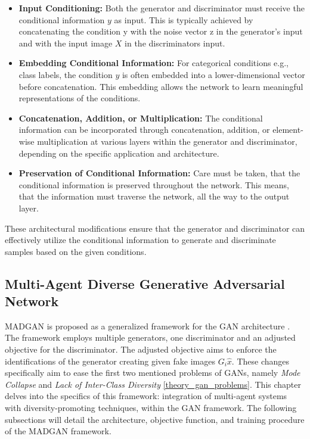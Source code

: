 \begin{itemize}
    \item \textbf{Input Conditioning:} Both the generator and discriminator must receive the conditional information \(y\) as input. This is typically achieved by concatenating the condition y with the noise vector z in the generator's input and with the input image \(X\) in the discriminators input.
    \item \textbf{Embedding Conditional Information:} For categorical conditions e.g., class labels, the condition \(y\) is often embedded into a lower-dimensional vector before concatenation. This embedding allows the network to learn meaningful representations of the conditions.
    \item \textbf{Concatenation, Addition, or Multiplication:} The conditional information can be incorporated through concatenation, addition, or element-wise multiplication at various layers within the generator and discriminator, depending on the specific application and architecture.
    \item \textbf{Preservation of Conditional Information:} Care must be taken, that the conditional information is preserved throughout the network. This means, that the information must traverse the network, all the way to the output layer.
\end{itemize}

\noindent
These architectural modifications ensure that the generator and discriminator can effectively utilize the conditional information to generate and discriminate samples based on the given conditions.

\subsection[Multi-Agent Diverse Generative Adversarial Network - MADGAN]{Multi-Agent Diverse Generative Adversarial Network}
\label{theoretical_madgan}
MADGAN is proposed as a generalized framework for the GAN architecture \cite{ghosh2018madgan}. The framework employs multiple generators, one discriminator and an adjusted objective for the discriminator. The adjusted objective aims to enforce the identifications of the generator creating given fake images \(G_{i} \hat{x}\). These changes specifically aim to ease the first two mentioned problems of GANs, namely \textit{Mode Collapse} and \textit{Lack of Inter-Class Diversity} \ref{theory_gan_problems}. This chapter delves into the specifics of this framework: integration of multi-agent systems with diversity-promoting techniques, within the GAN framework. The following subsections will detail the architecture, objective function, and training procedure of the MADGAN framework.

